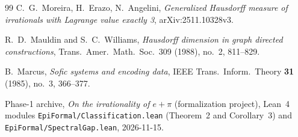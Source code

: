 \documentclass[11pt]{article}
\theoremstyle{definition}
\theoremstyle{remark}
\begin{document}
\begin{thebibliography}{99}
 C.~G.~Moreira, H.~Erazo, N.~Angelini,
\emph{Generalized Hausdorff measure of irrationals with Lagrange value exactly 3},
arXiv:2511.10328v3.

{\sloppy
{} R.~D.~Mauldin and S.~C.~Williams,
\emph{Hausdorff dimension in graph directed constructions},
Trans.~Amer.~Math.~Soc.~309 (1988), no.~2, 811--829.
}

 B.~Marcus, \emph{Sofic systems and encoding data},
IEEE Trans.~Inform.~Theory \textbf{31} (1985), no.~3, 366--377.

 Phase-1 archive, \emph{On the irrationality of $e+\pi$}
(formalization project), Lean~4 modules \texttt{EpiFormal/\allowbreak Classification.lean}
(Theorem~2 and Corollary~3) and \texttt{EpiFormal/\allowbreak Spectral\allowbreak Gap.lean}, 2026-11-15.
\end{thebibliography}
\end{document}
